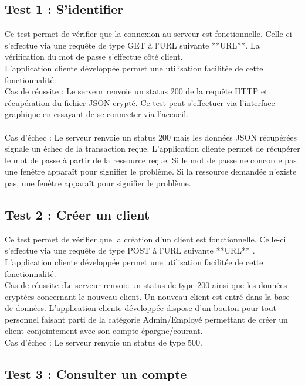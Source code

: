 \subsection{Test 1 : S'identifier}

Ce test permet de vérifier que la connexion au serveur est fonctionnelle.
Celle-ci s'effectue via une requête de type GET à l'URL suivante **URL**.
La vérification du mot de passe s'effectue côté client. 
\\
L'application cliente développée permet une utilisation facilitée de cette fonctionnalité. 
\\
Cas de réussite : Le serveur renvoie un status 200 de la requête HTTP et récupération du fichier JSON crypté. Ce test peut s'effectuer via l'interface graphique en essayant de se connecter via l'accueil.\\
\\
Cas d'échec : Le serveur renvoie un status 200 mais les données JSON récupérées signale un échec de la transaction reçue.
L'application cliente permet de récupérer le mot de passe à partir de la ressource reçue. Si le mot de passe ne concorde pas une fenêtre apparaît pour signifier le problème.
Si la ressource demandée n'existe pas,  une fenêtre apparaît pour signifier le problème.

\subsection{Test 2 : Créer un client}

Ce test permet de vérifier que la création d'un client est fonctionnelle.
Celle-ci s'effectue via une requête de type POST à l'URL suivante **URL** .
\\
L'application cliente développée permet une utilisation facilitée de cette fonctionnalité. 
\\
Cas de réussite :Le serveur renvoie un status de type 200 ainsi que les données cryptées concernant le nouveau client. Un nouveau client est entré dans la base de données.
L'application cliente développée dispose d'un bouton pour tout personnel faisant parti de la catégorie Admin/Employé permettant de créer un client conjointement avec son compte épargne/courant.
\\
Cas d'échec : Le serveur renvoie un status de type 500.

\subsection{Test 3 : Consulter un compte}

